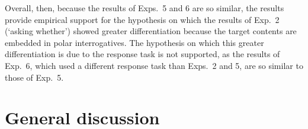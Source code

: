 \documentclass[times,linguex]{glossa}
\begin{document}




Overall, then, because the results of Exps.~5 and 6 are so similar, the results provide empirical support for the hypothesis on which the results of Exp.~2 (`asking whether') showed greater differentiation because the target contents are embedded in polar interrogatives. The hypothesis on which this greater differentiation is due to the response task is not supported, as the results of Exp.~6, which used a different response task than Exps.~2 and 5, are so similar to those of Exp.~5.

\section{General discussion \label{sec:4_discussion}}
\end{document}
